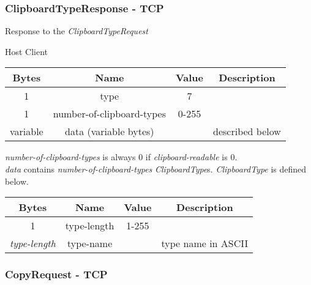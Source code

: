 \documentclass{article}
\begin{document}
    \subsubsection{ClipboardTypeResponse - TCP}

    Response to the \emph{ClipboardTypeRequest}

    \begin{center}
        Host \textrightarrow Client\\
        \begin{tabular}{|c|c|c|c|}
            \hline
            \textbf{Bytes} & \textbf{Name}             & \textbf{Value} & \textbf{Description} \\
            \hline
            1              & type                      & 7              &                      \\
            \hline
            1              & number-of-clipboard-types & 0-255          &                      \\
            \hline
            variable       & data (variable bytes)     &                & described below      \\
            \hline
        \end{tabular}
    \end{center}

    \emph{number-of-clipboard-types} is always 0 if \emph{clipboard-readable} is 0.\\

    \emph{data} contains \emph{number-of-clipboard-types} \emph{ClipboardType}s. \emph{ClipboardType} is defined below.

    \begin{center}
        \begin{tabular}{|c|c|c|c|}
            \hline
            \textbf{Bytes}     & \textbf{Name} & \textbf{Value} & \textbf{Description} \\
            \hline
            1                  & type-length   & 1-255          &                      \\
            \hline
            \emph{type-length} & type-name     &                & type name in ASCII   \\
            \hline
        \end{tabular}
    \end{center}

    \subsubsection{CopyRequest - TCP}
\end{document}
